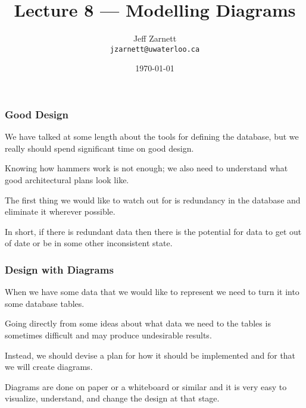 

\title{Lecture 8 --- Modelling Diagrams}

\author{Jeff Zarnett \\ \small \texttt{jzarnett@uwaterloo.ca}}
\date{\today}




\begin{frame}
  \titlepage

 \end{frame}


\begin{frame}
\frametitle{Good Design}

We have talked at some length about the tools for defining the database, but we really should spend significant time on good design. 

Knowing how hammers work is not enough; we also need to understand what good architectural plans look like.

The first thing we would like to watch out for is redundancy in the database and eliminate it wherever possible. 

In short, if there is redundant data then there is the potential for data to get out of date or be in some other inconsistent state. 

\end{frame}



\begin{frame}
\frametitle{Design with Diagrams}

When we have some data that we would like to represent we need to turn it into some database tables. 

Going directly from some ideas about what data we need to the tables is sometimes difficult and may produce undesirable results. 

Instead, we should devise a plan for how it should be implemented and for that we will create diagrams. 

Diagrams are done on paper or a whiteboard or similar and it is very easy to visualize, understand, and change the design at that stage.


\end{frame}



